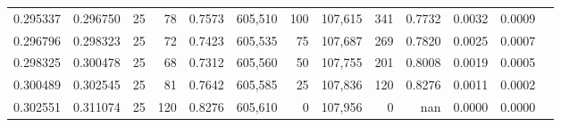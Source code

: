 \begin{tabular}{rrrrrrrrrrrrr}
0.295337 & 0.296750 &    25 &  78 &                                     0.7573 & 605,510 &     100 & 107,615 &     341 & 0.7732 & 0.0032 & 0.0009 \\
0.296796 & 0.298323 &    25 &  72 &                                     0.7423 & 605,535 &      75 & 107,687 &     269 & 0.7820 & 0.0025 & 0.0007 \\
0.298325 & 0.300478 &    25 &  68 &                                     0.7312 & 605,560 &      50 & 107,755 &     201 & 0.8008 & 0.0019 & 0.0005 \\
0.300489 & 0.302545 &    25 &  81 &                                     0.7642 & 605,585 &      25 & 107,836 &     120 & 0.8276 & 0.0011 & 0.0002 \\
0.302551 & 0.311074 &    25 & 120 &                                     0.8276 & 605,610 &       0 & 107,956 &       0 &    nan & 0.0000 & 0.0000 \\
\bottomrule
\end{tabular}
